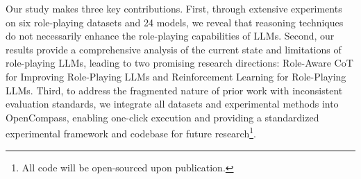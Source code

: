 Our study makes three key contributions. First, through extensive experiments on six role-playing datasets and 24 models, we reveal that reasoning techniques do not necessarily enhance the role-playing capabilities of LLMs. 
Second, our results provide a comprehensive analysis of the current state and limitations of role-playing LLMs, leading to two promising research directions: Role-Aware CoT for Improving Role-Playing LLMs and Reinforcement Learning for Role-Playing LLMs. 
Third, to address the fragmented nature of prior work with inconsistent evaluation standards, we integrate all datasets and experimental methods into OpenCompass, enabling one-click execution and providing a standardized experimental framework and codebase for future research\footnote{All code will be open-sourced upon publication.}.
